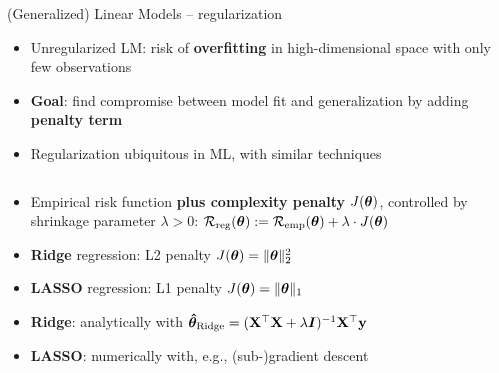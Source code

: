 \begin{frame}{(Generalized) Linear Models -- regularization}


\begin{itemize}
  \item Unregularized LM: risk of \textbf{overfitting} in high-dimensional 
  space with only few observations
  \item \textbf{Goal}: find compromise between model fit and generalization by 
  adding \textbf{penalty term}
  \item Regularization ubiquitous in ML, with similar techniques
\end{itemize}





\begin{columns}[c, totalwidth=\textwidth]
    \begin{column}{0.55\textwidth}
        

\begin{itemize}
  \item Empirical risk function \textbf{plus complexity penalty} 
  $J(\bm{\theta})$, controlled by shrinkage parameter $\lambda > 0$:
  $\mathcal{R}_{\text{reg}}(\bm{\theta}) := \mathcal{R}_{\text{emp}}(\bm{\theta}) + \lambda \cdot J(\bm{\theta})$
    \item \textbf{Ridge} regression: L2 penalty $J(\bm{\theta}) = \|\bm{\theta}\|_2^2 $
    \item \textbf{LASSO} regression: L1 penalty $J(\bm{\theta}) = \|\bm{\theta}\|_1 $
\end{itemize}

\medskip

\begin{itemize}
  \item \textbf{Ridge}: analytically with 
  $\bm{\hat\theta}_{\text{Ridge}} = (\mathbf{X}^\top \mathbf{X}  + \lambda \boldsymbol{I})^{-1} \mathbf{X}^\top 
  \mathbf{y}$
  \item \textbf{LASSO}: numerically with, e.g., (sub-)gradient descent
\end{itemize}




\end{column}
\end{columns}
\end{frame}
